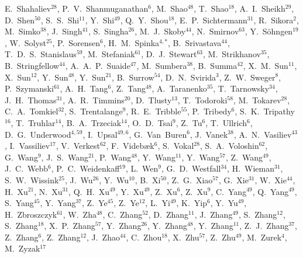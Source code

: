 {E.~Shahaliev$^{28}$,
P.~V.~Shanmuganathan$^{6}$,
M.~Shao$^{48}$,
T.~Shao$^{18}$,
A.~I.~Sheikh$^{29}$,
D.~Shen$^{50}$,
S.~S.~Shi$^{11}$,
Y.~Shi$^{49}$,
Q.~Y.~Shou$^{18}$,
E.~P.~Sichtermann$^{31}$,
R.~Sikora$^{2}$,
M.~Simko$^{38}$,
J.~Singh$^{41}$,
S.~Singha$^{26}$,
M.~J.~Skoby$^{44}$,
N.~Smirnov$^{63}$,
Y.~S\"{o}hngen$^{19}$,
W.~Solyst$^{25}$,
P.~Sorensen$^{6}$,
H.~M.~Spinka$^{4,*}$,
B.~Srivastava$^{44}$,
T.~D.~S.~Stanislaus$^{59}$,
M.~Stefaniak$^{61}$,
D.~J.~Stewart$^{63}$,
M.~Strikhanov$^{35}$,
B.~Stringfellow$^{44}$,
A.~A.~P.~Suaide$^{47}$,
M.~Sumbera$^{38}$,
B.~Summa$^{42}$,
X.~M.~Sun$^{11}$,
X.~Sun$^{12}$,
Y.~Sun$^{48}$,
Y.~Sun$^{21}$,
B.~Surrow$^{54}$,
D.~N.~Svirida$^{3}$,
Z.~W.~Sweger$^{8}$,
P.~Szymanski$^{61}$,
A.~H.~Tang$^{6}$,
Z.~Tang$^{48}$,
A.~Taranenko$^{35}$,
T.~Tarnowsky$^{34}$,
J.~H.~Thomas$^{31}$,
A.~R.~Timmins$^{20}$,
D.~Tlusty$^{13}$,
T.~Todoroki$^{58}$,
M.~Tokarev$^{28}$,
C.~A.~Tomkiel$^{32}$,
S.~Trentalange$^{9}$,
R.~E.~Tribble$^{55}$,
P.~Tribedy$^{6}$,
S.~K.~Tripathy$^{16}$,
T.~Truhlar$^{14}$,
B.~A.~Trzeciak$^{14}$,
O.~D.~Tsai$^{9}$,
Z.~Tu$^{6}$,
T.~Ullrich$^{6}$,
D.~G.~Underwood$^{4,59}$,
I.~Upsal$^{49,6}$,
G.~Van~Buren$^{6}$,
J.~Vanek$^{38}$,
A.~N.~Vasiliev$^{43}$,
I.~Vassiliev$^{17}$,
V.~Verkest$^{62}$,
F.~Videb{\ae}k$^{6}$,
S.~Vokal$^{28}$,
S.~A.~Voloshin$^{62}$,
G.~Wang$^{9}$,
J.~S.~Wang$^{21}$,
P.~Wang$^{48}$,
Y.~Wang$^{11}$,
Y.~Wang$^{57}$,
Z.~Wang$^{49}$,
J.~C.~Webb$^{6}$,
P.~C.~Weidenkaff$^{19}$,
L.~Wen$^{9}$,
G.~D.~Westfall$^{34}$,
H.~Wieman$^{31}$,
S.~W.~Wissink$^{25}$,
J.~Wu$^{26}$,
Y.~Wu$^{10}$,
B.~Xi$^{50}$,
Z.~G.~Xiao$^{57}$,
G.~Xie$^{31}$,
W.~Xie$^{44}$,
H.~Xu$^{21}$,
N.~Xu$^{31}$,
Q.~H.~Xu$^{49}$,
Y.~Xu$^{49}$,
Z.~Xu$^{6}$,
Z.~Xu$^{9}$,
C.~Yang$^{49}$,
Q.~Yang$^{49}$,
S.~Yang$^{45}$,
Y.~Yang$^{37}$,
Z.~Ye$^{45}$,
Z.~Ye$^{12}$,
L.~Yi$^{49}$,
K.~Yip$^{6}$,
Y.~Yu$^{49}$,
H.~Zbroszczyk$^{61}$,
W.~Zha$^{48}$,
C.~Zhang$^{52}$,
D.~Zhang$^{11}$,
J.~Zhang$^{49}$,
S.~Zhang$^{12}$,
S.~Zhang$^{18}$,
X.~P.~Zhang$^{57}$,
Y.~Zhang$^{26}$,
Y.~Zhang$^{48}$,
Y.~Zhang$^{11}$,
Z.~J.~Zhang$^{37}$,
Z.~Zhang$^{6}$,
Z.~Zhang$^{12}$,
J.~Zhao$^{44}$,
C.~Zhou$^{18}$,
X.~Zhu$^{57}$,
Z.~Zhu$^{49}$,
M.~Zurek$^{4}$,
M.~Zyzak$^{17}$
}

\address{\rm{(STAR Collaboration)}}

